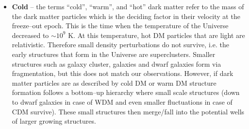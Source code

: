 \documentclass[paper=a4, fontsize=11pt]{scrartcl} %
\numberwithin{equation}{section} %
\numberwithin{figure}{section} %
\numberwithin{table}{section} %
\begin{document}
\begin{itemize}
  \item {\bf Cold} -- the terms ``cold'', ``warm'', and ``hot'' dark matter refer to the mass of the dark matter particles which is the deciding factor in their velocity at the freeze--out epoch. This is the time when the temperature of the Universe decreased to $\sim 10^9$ K. At this temperature, hot DM particles that are light are relativistic. Therefore small density perturbations do not survive, i.e. the early structures that form in the Universe are superclusters. Smaller structures such as galaxy cluster, galaxies and dwarf galaxies form via fragmentation, but this does not match our observations. However, if dark matter particles are as described by cold DM or warm DM structure formation follows a bottom--up hierarchy where small scale structures (down to dwarf galaxies in case of WDM and even smaller fluctuations in case of CDM survive). These small structures then merge/fall into the potential wells of larger growing structures. 
  
  
  \end{itemize}
\end{document}
